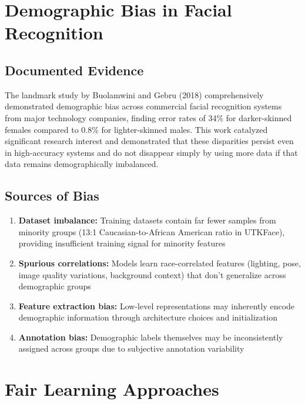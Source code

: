 \documentclass[11pt,a4paper,oneside]{report}
\begin{document}
\section{Demographic Bias in Facial Recognition}

\subsection{Documented Evidence}

The landmark study by Buolamwini and Gebru (2018) comprehensively demonstrated demographic bias across commercial facial recognition systems from major technology companies, finding error rates of 34\% for darker-skinned females compared to 0.8\% for lighter-skinned males. This work catalyzed significant research interest and demonstrated that these disparities persist even in high-accuracy systems and do not disappear simply by using more data if that data remains demographically imbalanced.

\subsection{Sources of Bias}

\begin{enumerate}

\item \textbf{Dataset imbalance:} Training datasets contain far fewer samples from minority groups (13:1 Caucasian-to-African American ratio in UTKFace), providing insufficient training signal for minority features

\item \textbf{Spurious correlations:} Models learn race-correlated features (lighting, pose, image quality variations, background context) that don't generalize across demographic groups

\item \textbf{Feature extraction bias:} Low-level representations may inherently encode demographic information through architecture choices and initialization

\item \textbf{Annotation bias:} Demographic labels themselves may be inconsistently assigned across groups due to subjective annotation variability

\end{enumerate}

\section{Fair Learning Approaches}
\end{document}
